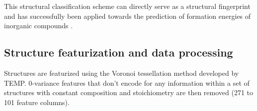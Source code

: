%
%
This structural classification scheme can directly serve as a structural fingerprint and has successfully been applied towards the prediction of formation energies of inorganic compounds \cite{Jain2018}.


%



%
%
%



\subsection{Structure featurization and data processing}  %
%


%
Structures are featurized using the Voronoi tessellation method developed by TEMP.
%
0-variance features that don't encode for any information within a set of structures with constant composition and stoichiometry are then removed (\num{271} to \num{101} feature columns).


